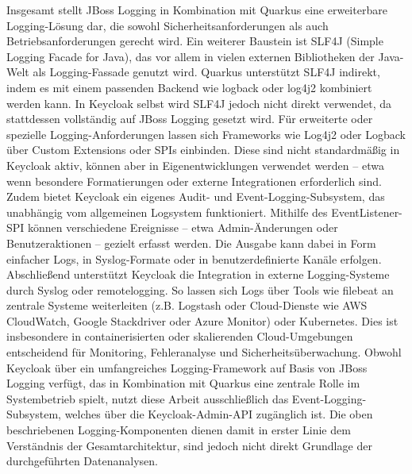 \documentclass[a4paper,12pt]{article}
\begin{document}
	\vspace{0.5em}
	Insgesamt stellt JBoss Logging in Kombination mit Quarkus eine erweiterbare Logging-Lösung dar, die sowohl Sicherheitsanforderungen als auch Betriebsanforderungen gerecht wird.
	\vspace{0.5em}
	Ein weiterer Baustein ist SLF4J (Simple Logging Facade for Java), das vor allem in vielen externen Bibliotheken der Java-Welt als Logging-Fassade genutzt wird. Quarkus unterstützt SLF4J indirekt, indem es mit einem passenden Backend wie logback oder log4j2 kombiniert werden kann. In Keycloak selbst wird SLF4J jedoch nicht direkt verwendet, da stattdessen vollständig auf JBoss Logging gesetzt wird.
	\vspace{0.5em}
	Für erweiterte oder spezielle Logging-Anforderungen lassen sich Frameworks wie Log4j2 oder Logback über Custom Extensions oder SPIs einbinden. Diese sind nicht standardmäßig in Keycloak aktiv, können aber in Eigenentwicklungen verwendet werden – etwa wenn besondere Formatierungen oder externe Integrationen erforderlich sind.
	\vspace{0.5em}
	Zudem bietet Keycloak ein eigenes Audit- und Event-Logging-Subsystem, das unabhängig vom allgemeinen Logsystem funktioniert. Mithilfe des EventListener-SPI können verschiedene Ereignisse – etwa Admin-Änderungen oder Benutzeraktionen – gezielt erfasst werden. Die Ausgabe kann dabei in Form einfacher Logs, in Syslog-Formate oder in benutzerdefinierte Kanäle erfolgen.
	\vspace{0.5em}
	Abschließend unterstützt Keycloak die Integration in externe Logging-Systeme durch Syslog oder \gls{remotelogging}. So lassen sich Logs über Tools wie \gls{filebeat} an zentrale Systeme weiterleiten (z.B. Logstash oder Cloud-Dienste wie AWS CloudWatch, Google Stackdriver oder Azure Monitor) oder Kubernetes. Dies ist insbesondere in containerisierten oder skalierenden Cloud-Umgebungen entscheidend für Monitoring, Fehleranalyse und Sicherheitsüberwachung.
	\vspace{0.5em}
	Obwohl Keycloak über ein umfangreiches Logging-Framework auf Basis von JBoss Logging verfügt, das in Kombination mit Quarkus eine zentrale Rolle im Systembetrieb spielt, nutzt diese Arbeit ausschließlich das Event-Logging-Subsystem, welches über die Keycloak-Admin-API zugänglich ist. Die oben beschriebenen Logging-Komponenten dienen damit in erster Linie dem Verständnis der Gesamtarchitektur, sind jedoch nicht direkt Grundlage der durchgeführten Datenanalysen.
	
\end{document}
